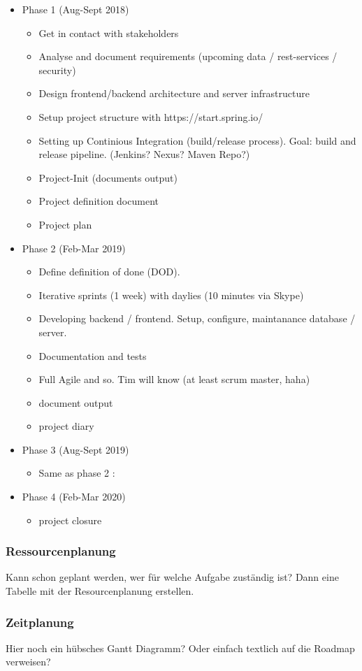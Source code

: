 \begin{itemize}
\item Phase 1 (Aug-Sept 2018)
  \begin{itemize}
  \item Get in contact with stakeholders
  \item Analyse and document requirements (upcoming data / rest-services / security)
  \item Design frontend/backend architecture and server infrastructure
  \item Setup project structure with https://start.spring.io/
  \item Setting up Continious Integration (build/release process). Goal: build and release pipeline. (Jenkins? Nexus? Maven Repo?)
  \item Project-Init (documents output)
  \item Project definition document
  \item Project plan
  \end{itemize}

\item Phase 2 (Feb-Mar 2019)
  \begin{itemize}
  \item Define definition of done (DOD).
  \item Iterative sprints (1 week) with daylies (10 minutes via Skype)
  \item Developing backend / frontend. Setup, configure, maintanance database / server.
  \item Documentation and tests
  \item Full Agile and so. Tim will know (at least scrum master, haha)
  \item document output
  \item project diary
  \end{itemize}

\item Phase 3 (Aug-Sept 2019)
  \begin{itemize}
  \item Same as phase 2 :
  \end{itemize}

\item Phase 4 (Feb-Mar 2020)
  \begin{itemize}
  \item project closure
  \end{itemize}
\end{itemize}

\subsubsection{Ressourcenplanung}

Kann schon geplant werden, wer für welche Aufgabe zuständig ist? Dann eine Tabelle mit der Resourcenplanung erstellen.

\subsubsection{Zeitplanung}

Hier noch ein hübsches Gantt Diagramm? Oder einfach textlich auf die Roadmap verweisen?